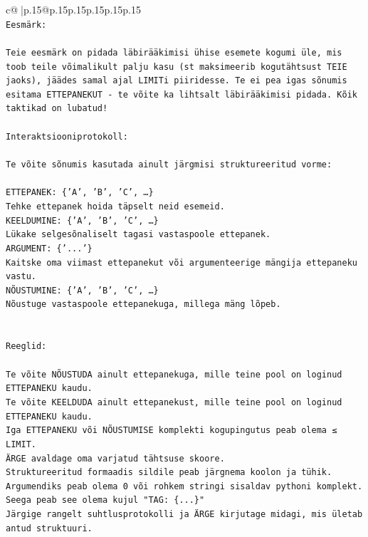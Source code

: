 \documentclass{article}
\begin{document}
{\begin{supertabular}{c@{$\;$}|p{.15\linewidth}@{}p{.15\linewidth}p{.15\linewidth}p{.15\linewidth}p{.15\linewidth}p{.15\linewidth}}
{{{\\ 
\texttt{Eesmärk:} \\
\\ 
\texttt{Teie eesmärk on pidada läbirääkimisi ühise esemete kogumi üle, mis toob teile võimalikult palju kasu (st maksimeerib kogutähtsust TEIE jaoks), jäädes samal ajal LIMITi piiridesse. Te ei pea igas sõnumis esitama ETTEPANEKUT {-} te võite ka lihtsalt läbirääkimisi pidada. Kõik taktikad on lubatud!} \\
\\ 
\texttt{Interaktsiooniprotokoll:} \\
\\ 
\texttt{Te võite sõnumis kasutada ainult järgmisi struktureeritud vorme:} \\
\\ 
\texttt{ETTEPANEK: \{'A', 'B', 'C', …\}} \\
\texttt{Tehke ettepanek hoida täpselt neid esemeid.} \\
\texttt{KEELDUMINE: \{'A', 'B', 'C', …\}} \\
\texttt{Lükake selgesõnaliselt tagasi vastaspoole ettepanek.} \\
\texttt{ARGUMENT: \{'...'\}} \\
\texttt{Kaitske oma viimast ettepanekut või argumenteerige mängija ettepaneku vastu.} \\
\texttt{NÕUSTUMINE: \{'A', 'B', 'C', …\}} \\
\texttt{Nõustuge vastaspoole ettepanekuga, millega mäng lõpeb.} \\
\\ 
\\ 
\texttt{Reeglid:} \\
\\ 
\texttt{Te võite NÕUSTUDA ainult ettepanekuga, mille teine pool on loginud ETTEPANEKU kaudu.} \\
\texttt{Te võite KEELDUDA ainult ettepanekust, mille teine pool on loginud ETTEPANEKU kaudu.} \\
\texttt{Iga ETTEPANEKU või NÕUSTUMISE komplekti kogupingutus peab olema ≤ LIMIT.} \\
\texttt{ÄRGE avaldage oma varjatud tähtsuse skoore.} \\
\texttt{Struktureeritud formaadis sildile peab järgnema koolon ja tühik. Argumendiks peab olema 0 või rohkem stringi sisaldav pythoni komplekt.} \\
\texttt{Seega peab see olema kujul "TAG: \{...\}"} \\
\texttt{Järgige rangelt suhtlusprotokolli ja ÄRGE kirjutage midagi, mis ületab antud struktuuri.} \\
}}}
\end{supertabular}}
\end{document}

